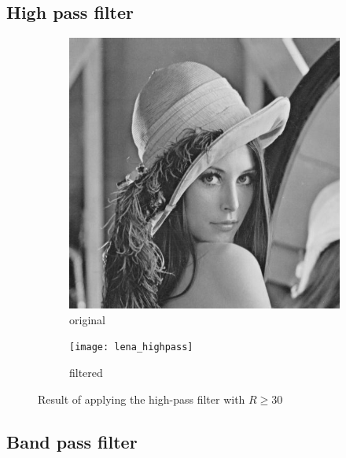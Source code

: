 \documentclass[12pt]{article}
\renewcommand*{\subfiguresize}{.35\textwidth}
\begin{document}
\subsection{High pass filter}

\begin{figure}[H]\centering
    \begin{subfigure}[ht]{\subfiguresize}
        \includegraphics[width=\textwidth]{lena}
        \caption{original}
    \end{subfigure}
    \hspace*{2em}
    \begin{subfigure}[ht]{\subfiguresize}
        \texttt{[image: lena\_highpass]}
        \caption{filtered}
    \end{subfigure}
    \caption{Result of applying the high-pass filter with $R \geq 30$}
\end{figure}

\subsection{Band pass filter}
\end{document}
